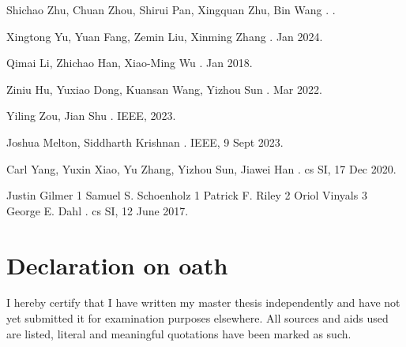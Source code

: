 \documentclass{report} %
\begin{document}
\begin{thebibliography}{00}
    \newblock Shichao Zhu, Chuan Zhou, Shirui Pan, Xingquan Zhu, Bin Wang
    .
    .

    \newblock Xingtong Yu, Yuan Fang, Zemin Liu, Xinming Zhang
    .
     Jan 2024.

    \newblock Qimai Li, Zhichao Han, Xiao-Ming Wu
    .
     Jan 2018.

    \newblock Ziniu Hu, Yuxiao Dong, Kuansan Wang, Yizhou Sun
    .
     Mar 2022.

    \newblock Yiling Zou, Jian Shu
    .
    \newblock IEEE, 2023.

    \newblock Joshua Melton, Siddharth Krishnan
    .
    \newblock IEEE, 9 Sept 2023.

    \newblock Carl Yang, Yuxin Xiao, Yu Zhang, Yizhou Sun, Jiawei Han
    .
    \newblock cs SI, 17 Dec 2020.

    \newblock Justin Gilmer 1 Samuel S. Schoenholz 1 Patrick F. Riley 2 Oriol Vinyals 3 George E. Dahl
    .
    \newblock cs SI, 12 June 2017.

    \end{thebibliography}
\newpage 

\newpage 

\chapter*{Declaration on oath}

\vspace{1cm}

\noindent I hereby certify that I have written my master thesis independently and have not yet submitted it for examination purposes elsewhere. All sources and aids used are listed, literal and meaningful quotations have been marked as such.
\end{document}

